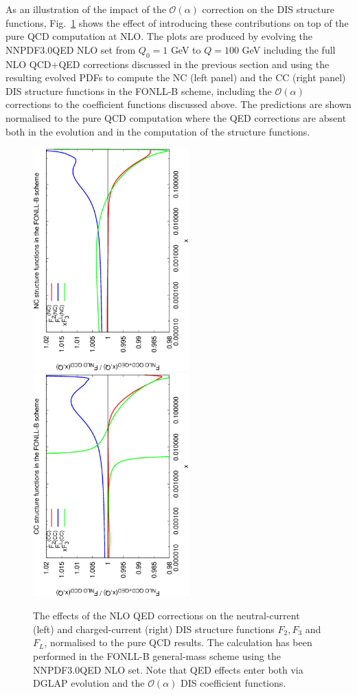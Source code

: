 As an illustration of the impact of the $\mathcal{O}(\alpha)$
correction on the DIS structure functions, Fig.~\ref{fig:StructFuncs}
shows the effect of introducing these contributions on top of the pure
QCD computation at NLO. The plots are produced by evolving the
NNPDF3.0QED NLO set from $Q_0=1$ GeV to $Q=100$ GeV including the full
NLO QCD+QED corrections discussed in the previous section and using
the resulting evolved PDFs to compute the NC (left panel) and the CC
(right panel) DIS structure functions in the FONLL-B scheme, including
the $\mathcal{O}(\alpha)$ corrections to the coefficient functions
discussed above.
%
The predictions are shown normalised to the pure QCD computation where
the QED corrections are absent both in the evolution and in the
computation of the structure functions.

\begin{figure}[t]
\includegraphics[width=6cm,angle=270]{figs/NLOQEDCorrections_NC.eps}
\includegraphics[width=6cm,angle=270]{figs/NLOQEDCorrections_CC.eps}
\caption{The effects of the NLO QED corrections on the neutral-current
(left) and charged-current (right) DIS structure functions
$F_2, F_3$ and $F_L$, normalised to the pure QCD results.
%
The calculation has been performed in the FONLL-B general-mass scheme using the NNPDF3.0QED NLO
set.
%
Note that QED effects enter both via DGLAP evolution and the
$\mathcal{O}(\alpha)$ DIS coefficient functions.}
\label{fig:StructFuncs}
\end{figure}

